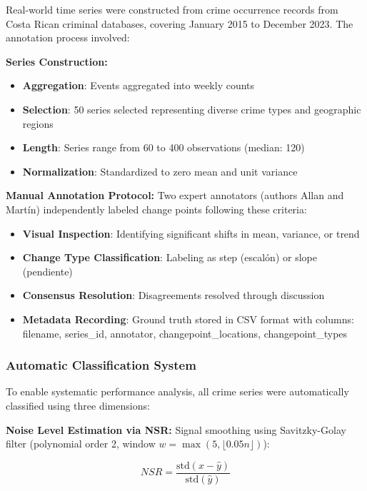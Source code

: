 \documentclass[journal,article,submit,pdftex,moreauthors]{Definitions/mdpi}
\begin{document}
Real-world time series were constructed from crime occurrence records from Costa Rican criminal databases, covering January 2015 to December 2023. The annotation process involved:

\textbf{Series Construction:}
\begin{itemize}
    \item \textbf{Aggregation}: Events aggregated into weekly counts
    \item \textbf{Selection}: 50 series selected representing diverse crime types and geographic regions
    \item \textbf{Length}: Series range from 60 to 400 observations (median: 120)
    \item \textbf{Normalization}: Standardized to zero mean and unit variance
\end{itemize}

\textbf{Manual Annotation Protocol:}
Two expert annotators (authors Allan and Martín) independently labeled change points following these criteria:
\begin{itemize}
    \item \textbf{Visual Inspection}: Identifying significant shifts in mean, variance, or trend
    \item \textbf{Change Type Classification}: Labeling as step (escalón) or slope (pendiente)
    \item \textbf{Consensus Resolution}: Disagreements resolved through discussion
    \item \textbf{Metadata Recording}: Ground truth stored in CSV format with columns: filename, series\_id, annotator, changepoint\_locations, changepoint\_types
\end{itemize}

\subsubsection{Automatic Classification System}

To enable systematic performance analysis, all crime series were automatically classified using three dimensions:

\textbf{Noise Level Estimation via NSR:}
Signal smoothing using Savitzky-Golay filter (polynomial order 2, window $w = \max(5, \lfloor 0.05n \rfloor)$):
\begin{linenomath}
\begin{equation}
NSR = \frac{\text{std}(x - \hat{y})}{\text{std}(\hat{y})}
\end{equation}
\end{linenomath}
\end{document}
